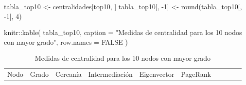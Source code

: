 \documentclass[
  letterpaper,
  DIV=11,
  numbers=noendperiod]{scrreprt}
\newenvironment{Shaded}{\begin{snugshade}}{\end{snugshade}}
\newcommand{\AttributeTok}[1]{\textcolor[rgb]{0.40,0.45,0.13}{#1}}
\newcommand{\ConstantTok}[1]{\textcolor[rgb]{0.56,0.35,0.01}{#1}}
\newcommand{\DecValTok}[1]{\textcolor[rgb]{0.68,0.00,0.00}{#1}}
\newcommand{\FunctionTok}[1]{\textcolor[rgb]{0.28,0.35,0.67}{#1}}
\newcommand{\NormalTok}[1]{\textcolor[rgb]{0.00,0.23,0.31}{#1}}
\newcommand{\OtherTok}[1]{\textcolor[rgb]{0.00,0.23,0.31}{#1}}
\newcommand{\SpecialCharTok}[1]{\textcolor[rgb]{0.37,0.37,0.37}{#1}}
\newcommand{\StringTok}[1]{\textcolor[rgb]{0.13,0.47,0.30}{#1}}
\begin{document}
\begin{Shaded}
\begin{Highlighting}[]
\NormalTok{tabla\_top10 }\OtherTok{\textless{}{-}}\NormalTok{ centralidades[top10, ]}
\NormalTok{tabla\_top10[, }\SpecialCharTok{{-}}\DecValTok{1}\NormalTok{] }\OtherTok{\textless{}{-}} \FunctionTok{round}\NormalTok{(tabla\_top10[, }\SpecialCharTok{{-}}\DecValTok{1}\NormalTok{], }\DecValTok{4}\NormalTok{)}

\NormalTok{knitr}\SpecialCharTok{::}\FunctionTok{kable}\NormalTok{(}
\NormalTok{  tabla\_top10,}
  \AttributeTok{caption =} \StringTok{"Medidas de centralidad para los 10 nodos con mayor grado"}\NormalTok{,}
  \AttributeTok{row.names =} \ConstantTok{FALSE}
\NormalTok{)}
\end{Highlighting}
\end{Shaded}

\begin{longtable}[]{@{}
  >{\raggedright\arraybackslash}p{}
  >{\raggedleft\arraybackslash}p{}
  >{\raggedleft\arraybackslash}p{}
  >{\raggedleft\arraybackslash}p{}
  >{\raggedleft\arraybackslash}p{}
  >{\raggedleft\arraybackslash}p{}
  >{\raggedleft\arraybackslash}p{}
  >{\raggedleft\arraybackslash}p{}
  >{\raggedleft\arraybackslash}p{}
  >{\raggedleft\arraybackslash}p{}@{}}
\caption{Medidas de centralidad para los 10 nodos con mayor
grado}\tabularnewline
\toprule\noalign{}
\begin{minipage}[b]{\linewidth}\raggedright
Nodo
\end{minipage} & \begin{minipage}[b]{\linewidth}\raggedleft
Grado
\end{minipage} & \begin{minipage}[b]{\linewidth}\raggedleft
Cercanía
\end{minipage} & \begin{minipage}[b]{\linewidth}\raggedleft
Intermediación
\end{minipage} & \begin{minipage}[b]{\linewidth}\raggedleft
Eigenvector
\end{minipage} & \begin{minipage}[b]{\linewidth}\raggedleft
PageRank
\end{minipage} & \begin{minipage}[b]{\linewidth}\raggedleft

\end{minipage}
\end{longtable}
\end{document}
